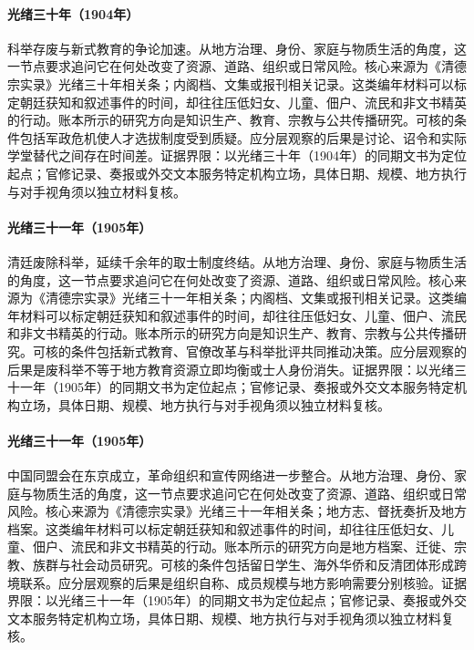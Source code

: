 \hypertarget{social:EQ-1904-IMPERIAL-EXAMINATION-DEBATE}{}\paragraph{光绪三十年（1904年）}科举存废与新式教育的争论加速。从地方治理、身份、家庭与物质生活的角度，这一节点要求追问它在何处改变了资源、道路、组织或日常风险。核心来源为《清德宗实录》光绪三十年相关条；内阁档、文集或报刊相关记录。这类编年材料可以标定朝廷获知和叙述事件的时间，却往往压低妇女、儿童、佃户、流民和非文书精英的行动。账本所示的研究方向是知识生产、教育、宗教与公共传播研究。可核的条件包括军政危机使人才选拔制度受到质疑。应分层观察的后果是讨论、诏令和实际学堂替代之间存在时间差。证据界限：以光绪三十年（1904年）的同期文书为定位起点；官修记录、奏报或外交文本服务特定机构立场，具体日期、规模、地方执行与对手视角须以独立材料复核。
\hypertarget{social:EQ-1905-ABOLITION-OF-CIVIL-SERVICE-EXAM}{}\paragraph{光绪三十一年（1905年）}清廷废除科举，延续千余年的取士制度终结。从地方治理、身份、家庭与物质生活的角度，这一节点要求追问它在何处改变了资源、道路、组织或日常风险。核心来源为《清德宗实录》光绪三十一年相关条；内阁档、文集或报刊相关记录。这类编年材料可以标定朝廷获知和叙述事件的时间，却往往压低妇女、儿童、佃户、流民和非文书精英的行动。账本所示的研究方向是知识生产、教育、宗教与公共传播研究。可核的条件包括新式教育、官僚改革与科举批评共同推动决策。应分层观察的后果是废科举不等于地方教育资源立即均衡或士人身份消失。证据界限：以光绪三十一年（1905年）的同期文书为定位起点；官修记录、奏报或外交文本服务特定机构立场，具体日期、规模、地方执行与对手视角须以独立材料复核。
\hypertarget{social:EQ-1905-TONGMENGHUI}{}\paragraph{光绪三十一年（1905年）}中国同盟会在东京成立，革命组织和宣传网络进一步整合。从地方治理、身份、家庭与物质生活的角度，这一节点要求追问它在何处改变了资源、道路、组织或日常风险。核心来源为《清德宗实录》光绪三十一年相关条；地方志、督抚奏折及地方档案。这类编年材料可以标定朝廷获知和叙述事件的时间，却往往压低妇女、儿童、佃户、流民和非文书精英的行动。账本所示的研究方向是地方档案、迁徙、宗教、族群与社会动员研究。可核的条件包括留日学生、海外华侨和反清团体形成跨境联系。应分层观察的后果是组织自称、成员规模与地方影响需要分别核验。证据界限：以光绪三十一年（1905年）的同期文书为定位起点；官修记录、奏报或外交文本服务特定机构立场，具体日期、规模、地方执行与对手视角须以独立材料复核。
